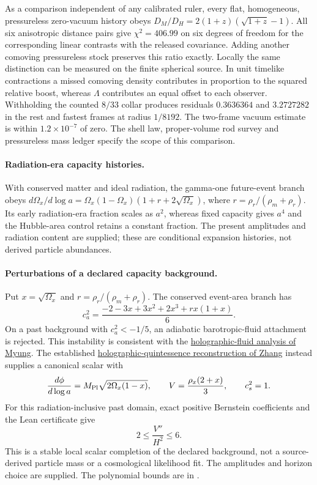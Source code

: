 \documentclass[11pt]{article}
\theoremstyle{remark}
\theoremstyle{plain}
\begin{document}
As a comparison independent of any calibrated ruler, every flat,
homogeneous, pressureless zero-vacuum history obeys
$D_M/D_H=2(1+z)(\sqrt{1+z}-1)$. All six anisotropic distance pairs
give $\chi^2=406.99$ on six degrees of freedom for the corresponding
linear contrasts with the released covariance. Adding another comoving
pressureless stock preserves this ratio exactly. Locally the same
distinction can be measured on the finite spherical source. In unit
timelike contractions a missed comoving density contributes in proportion
to the squared relative boost, whereas $\Lambda$ contributes an equal
offset to each observer. Withholding the counted $8/33$ collar produces
residuals $0.3636364$ and $3.2727282$ in the rest and fastest frames at
radius $1/8192$. The two-frame vacuum estimate is within
$1.2\times10^{-7}$ of zero. The shell law, proper-volume rod survey and
pressureless mass ledger specify the scope of this comparison.

\paragraph{Radiation-era capacity histories.}
With conserved matter and ideal radiation, the gamma-one future-event
branch obeys
$d\Omega_x/d\log a=\Omega_x(1-\Omega_x)(1+r+2\sqrt{\Omega_x})$,
where $r=\rho_r/(\rho_m+\rho_r)$.
Its early radiation-era fraction scales as $a^2$, whereas fixed capacity
gives $a^4$ and the Hubble-area control retains a constant fraction.
The present amplitudes and radiation content are supplied; these are
conditional expansion histories, not derived particle abundances.

\paragraph{Perturbations of a declared capacity background.}
Put $x=\sqrt{\Omega_x}$ and
$r=\rho_r/(\rho_m+\rho_r)$. The conserved event-area branch has
\[
 c_a^2=\frac{-2-3x+3x^2+2x^3+rx(1+x)}6.
\]
On a past background with $c_a^2<-1/5$, an adiabatic barotropic-fluid
attachment is rejected. This instability is consistent
with the \href{https://arxiv.org/abs/0706.3757}{holographic-fluid analysis
of Myung}. The established
\href{https://arxiv.org/abs/astro-ph/0604484}{holographic-quintessence
reconstruction of Zhang} instead supplies a canonical scalar with
\[
 \frac{d\phi}{d\log a}=M_{\rm Pl}\sqrt{2\Omega_x(1-x)},\qquad
 V=\frac{\rho_x(2+x)}3,\qquad c_s^2=1.
\]
For this radiation-inclusive past domain, exact positive Bernstein
coefficients and the Lean certificate give
\[
 2\le\frac{V''}{H^2}\le6.
\]
This is a stable local scalar completion of the declared background,
not a source-derived particle mass or a cosmological likelihood fit.
The amplitudes and horizon choice are supplied. The polynomial
bounds are in .
\end{document}
